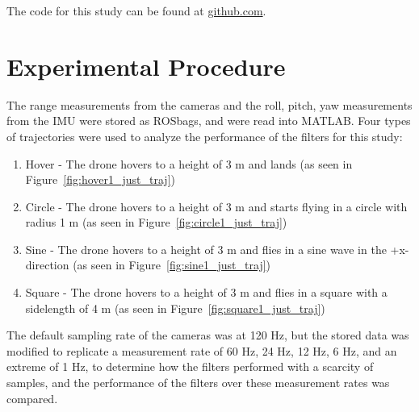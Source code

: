 \documentclass[letterpaper, paper,11pt]{AAS}	%
\begin{document}
The code for this study can be found at \url{github.com}.

\section{Experimental Procedure}

The range measurements from the cameras and the roll, pitch, yaw measurements from the IMU were stored as ROSbags, and were read into MATLAB. Four types of trajectories were used to analyze the performance of the filters for this study:
\begin{enumerate}[label=(\alph*)]
\item Hover - The drone hovers to a height of 3 m and lands (as seen in Figure~\ref{fig:hover1_just_traj})
\item Circle - The drone hovers to a height of 3 m and starts flying in a circle with radius 1 m (as seen in Figure~\ref{fig:circle1_just_traj})
\item Sine - The drone hovers to a height of 3 m and flies in a sine wave in the +x-direction (as seen in Figure~\ref{fig:sine1_just_traj})
\item Square - The drone hovers to a height of 3 m and flies in a square with a sidelength of 4 m (as seen in Figure~\ref{fig:square1_just_traj})
\end{enumerate}

The default sampling rate of the cameras was at 120 Hz, but the stored data was modified to replicate a measurement rate of 60 Hz, 24 Hz, 12 Hz, 6 Hz, and an extreme of 1 Hz, to determine how the filters performed with a scarcity of samples, and the performance of the filters over these measurement rates was compared.
\end{document}
